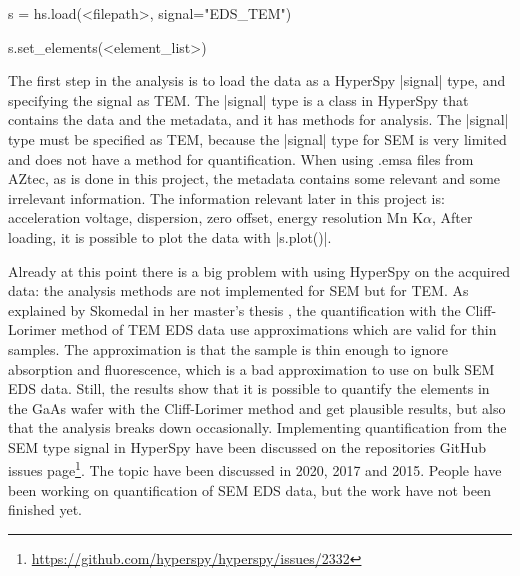 
\begin{lcverbatim}
    s = hs.load(<filepath>, signal="EDS_TEM")

    s.set_elements(<element_list>)
\end{lcverbatim}

The first step in the analysis is to load the data as a HyperSpy \cverb|signal| type, and specifying the signal as TEM.
The \cverb|signal| type is a class in HyperSpy that contains the data and the metadata, and it has methods for analysis.
The \cverb|signal| type must be specified as TEM, because the \cverb|signal| type for SEM is very limited and does not have a method for quantification.
When using .emsa files from AZtec, as is done in this project, the metadata contains some relevant and some irrelevant information.
The information relevant later in this project is:
acceleration voltage, dispersion, zero offset, energy resolution Mn K$\alpha$,
After loading, it is possible to plot the data with \cverb|s.plot()|.

Already at this point there is a big problem with using HyperSpy on the acquired data: the analysis methods are not implemented for SEM but for TEM.
As explained by Skomedal in her master's thesis \cite{skomedal_improving_2022}, the quantification with the Cliff-Lorimer method of TEM EDS data use approximations which are valid for thin samples.
The approximation is that the sample is thin enough to ignore absorption and fluorescence, which is a bad approximation to use on bulk SEM EDS data.
Still, the results show that it is possible to quantify the elements in the GaAs wafer with the Cliff-Lorimer method and get plausible results, but also that the analysis breaks down occasionally. %
Implementing quantification from the SEM type signal in HyperSpy have been discussed on the repositories GitHub issues page\footnote{\url{https://github.com/hyperspy/hyperspy/issues/2332}}.
The topic have been discussed in 2020, 2017 and 2015.
People have been working on quantification of SEM EDS data, but the work have not been finished yet.




